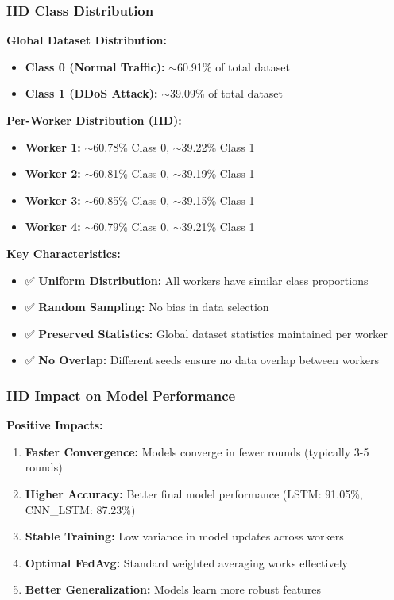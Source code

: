 \documentclass[12pt,a4paper]{article}
\begin{document}
\subsubsection{IID Class Distribution}

\textbf{Global Dataset Distribution:}
\begin{itemize}
    \item \textbf{Class 0 (Normal Traffic):} $\sim$60.91\% of total dataset
    \item \textbf{Class 1 (DDoS Attack):} $\sim$39.09\% of total dataset
\end{itemize}

\textbf{Per-Worker Distribution (IID):}
\begin{itemize}
    \item \textbf{Worker 1:} $\sim$60.78\% Class 0, $\sim$39.22\% Class 1
    \item \textbf{Worker 2:} $\sim$60.81\% Class 0, $\sim$39.19\% Class 1
    \item \textbf{Worker 3:} $\sim$60.85\% Class 0, $\sim$39.15\% Class 1
    \item \textbf{Worker 4:} $\sim$60.79\% Class 0, $\sim$39.21\% Class 1
\end{itemize}

\textbf{Key Characteristics:}
\begin{itemize}
    \item ✅ \textbf{Uniform Distribution:} All workers have similar class proportions
    \item ✅ \textbf{Random Sampling:} No bias in data selection
    \item ✅ \textbf{Preserved Statistics:} Global dataset statistics maintained per worker
    \item ✅ \textbf{No Overlap:} Different seeds ensure no data overlap between workers
\end{itemize}

\subsubsection{IID Impact on Model Performance}

\textbf{Positive Impacts:}
\begin{enumerate}
    \item \textbf{Faster Convergence:} Models converge in fewer rounds (typically 3-5 rounds)
    \item \textbf{Higher Accuracy:} Better final model performance (LSTM: 91.05\%, CNN\_LSTM: 87.23\%)
    \item \textbf{Stable Training:} Low variance in model updates across workers
    \item \textbf{Optimal FedAvg:} Standard weighted averaging works effectively
    \item \textbf{Better Generalization:} Models learn more robust features
\end{enumerate}
\end{document}
